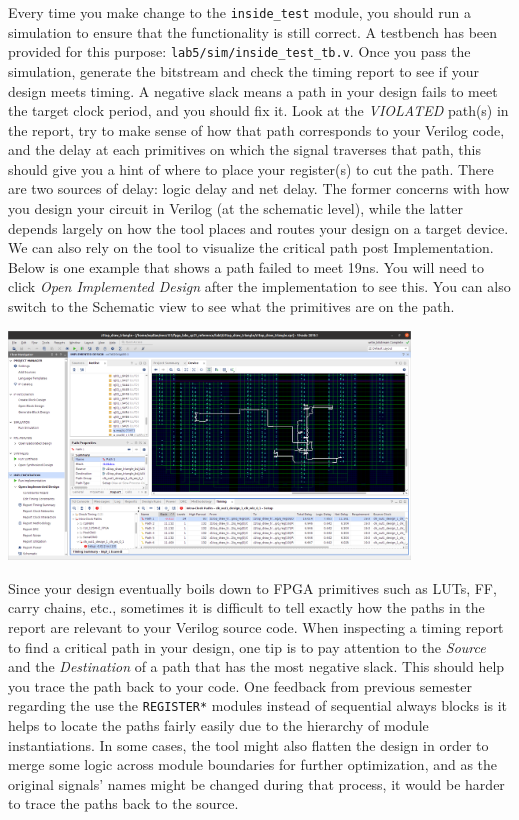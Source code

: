 \documentclass[11pt]{article}
\begin{document}
Every time you make change to the \verb|inside_test| module, you should run a simulation to ensure that the functionality is still correct. A testbench has been provided for this purpose: \verb|lab5/sim/inside_test_tb.v|. Once you pass the simulation, generate the bitstream and check the timing report to see if your design meets timing. A negative slack means a path in your design fails to meet the target clock period, and you should fix it. Look at the \textit{VIOLATED} path(s) in the report, try to make sense of how that path corresponds to your Verilog code, and the delay at each primitives on which the signal traverses that path, this should give you a hint of where to place your register(s) to cut the path. There are two sources of delay: logic delay and net delay. The former concerns with how you design your circuit in Verilog (at the schematic level), while the latter depends largely on how the tool places and routes your design on a target device. We can also rely on the tool to visualize the critical path post Implementation. Below is one example that shows a path failed to meet 19ns. You will need to click \textit{Open Implemented Design} after the implementation to see this. You can also switch to the Schematic view to see what the primitives are on the path.

\begin{center}
\includegraphics[width=0.8\textwidth]{figs/critical_path_vivado.png}
\end{center}

Since your design eventually boils down to FPGA primitives such as LUTs, FF, carry chains, etc., sometimes it is difficult to tell exactly how the paths in the report are relevant to your Verilog source code. When inspecting a timing report to find a critical path in your design, one tip is to pay attention to the \textit{Source} and the \textit{Destination} of a path that has the most negative slack. This should help you trace the path back to your code. One feedback from previous semester regarding the use the \texttt{REGISTER*} modules instead of sequential always blocks is it helps to locate the paths fairly easily due to the hierarchy of module instantiations. In some cases, the tool might also flatten the design in order to merge some logic across module boundaries for further optimization, and as the original signals' names might be changed during that process, it would be harder to trace the paths back to the source.
\end{document}
